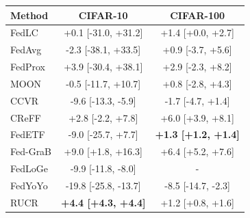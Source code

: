 \begin{tabular}{lcc}
\toprule
Method & CIFAR-10 & CIFAR-100\\
\midrule
FedLC & +0.1 [-31.0, +31.2] & +1.4 [+0.0, +2.7]\\
FedAvg & -2.3 [-38.1, +33.5] & +0.9 [-3.7, +5.6]\\
FedProx & +3.9 [-30.4, +38.1] & +2.9 [-2.3, +8.2]\\
MOON & -0.5 [-11.7, +10.7] & +0.8 [-2.8, +4.3]\\
CCVR & -9.6 [-13.3, -5.9] & -1.7 [-4.7, +1.4]\\
CReFF & +2.8 [-2.2, +7.8] & +6.0 [+3.9, +8.1]\\
FedETF & -9.0 [-25.7, +7.7] & \textbf{+1.3 [+1.2, +1.4]}\\
Fed-GraB & +9.0 [+1.8, +16.3] & +6.4 [+5.2, +7.6]\\
FedLoGe & -9.9 [-11.8, -8.0] & -\\
FedYoYo & -19.8 [-25.8, -13.7] & -8.5 [-14.7, -2.3]\\
RUCR & \textbf{+4.4 [+4.3, +4.4]} & +1.2 [+0.8, +1.6]\\
\bottomrule
\end{tabular}
